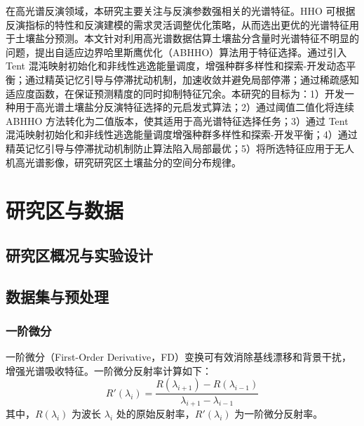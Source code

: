 \documentclass[12pt,a4paper]{article}
\begin{document}
在高光谱反演领域，本研究主要关注与反演参数强相关的光谱特征。HHO 可根据反演指标的特性和反演建模的需求灵活调整优化策略，从而选出更优的光谱特征用于土壤盐分预测。本文针对利用高光谱数据估算土壤盐分含量时光谱特征不明显的问题，提出自适应边界哈里斯鹰优化（ABHHO）算法用于特征选择。通过引入 Tent 混沌映射初始化和非线性逃逸能量调度，增强种群多样性和探索-开发动态平衡；通过精英记忆引导与停滞扰动机制，加速收敛并避免局部停滞；通过稀疏感知适应度函数，在保证预测精度的同时抑制特征冗余。本研究的目标为：1）开发一种用于高光谱土壤盐分反演特征选择的元启发式算法；2）通过阈值二值化将连续 ABHHO 方法转化为二值版本，使其适用于高光谱特征选择任务；3）通过 Tent 混沌映射初始化和非线性逃逸能量调度增强种群多样性和探索-开发平衡；4）通过精英记忆引导与停滞扰动机制防止算法陷入局部最优；5）将所选特征应用于无人机高光谱影像，研究研究区土壤盐分的空间分布规律。


\section{研究区与数据}
\label{sec:study_area}

\subsection{研究区概况与实验设计}


\subsection{数据集与预处理}


\subsubsection{一阶微分}

一阶微分（First-Order Derivative，FD）变换可有效消除基线漂移和背景干扰，增强光谱吸收特征。一阶微分反射率计算如下：
\begin{equation}
    R'(\lambda_i) = \frac{R(\lambda_{i+1}) - R(\lambda_{i-1})}{\lambda_{i+1} - \lambda_{i-1}}
    \label{eq:fd}
\end{equation}
其中，$R(\lambda_i)$ 为波长 $\lambda_i$ 处的原始反射率，$R'(\lambda_i)$ 为一阶微分反射率。
\end{document}
